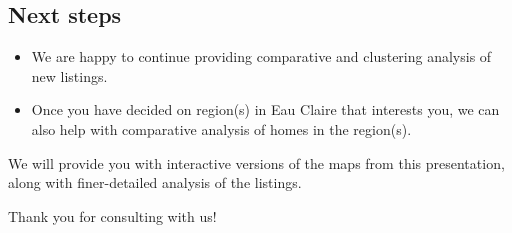 \documentclass{beamer}
\begin{document}
\subsection{Next steps}
\begin{frame}
    \begin{itemize}
        \item We are happy to continue providing comparative and clustering analysis of new listings. \pause
        \item Once you have decided on region(s) in Eau Claire that interests you, we can also help with comparative analysis of homes in the region(s).
    \end{itemize}
\end{frame}

\begin{frame}
    We will provide you with interactive versions of the maps from this presentation, along with finer-detailed analysis of the listings.
\end{frame}


\begin{frame}
    \begin{center}
        Thank you for consulting with us!
    \end{center}
\end{frame}
\end{document}
